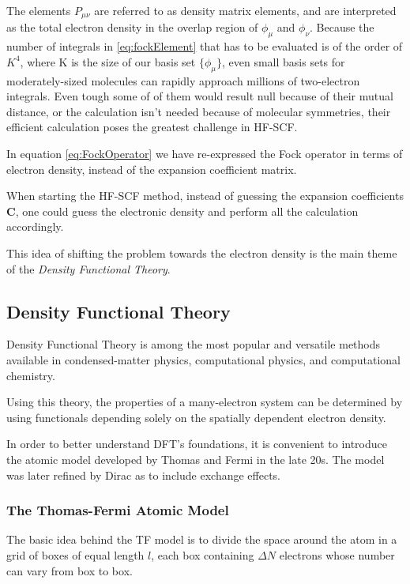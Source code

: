 \documentclass[a4paper,12pt]{article}
\begin{document}
The elements $P_{\mu \nu}$ are referred to as density matrix elements, and are interpreted as the total electron density in the overlap region of $\phi_{\mu}$ and $\phi_{\nu}$.
Because the number of integrals in \eqref{eq:fockElement} that has to be evaluated is of the order of $K^4$, where K is the size of our basis set $\{\phi_{\mu}\}$, even small basis sets for moderately-sized molecules can rapidly approach millions of two-electron integrals. 
Even tough some of of them would result null because of their mutual distance, or the calculation isn't needed because of molecular symmetries, their efficient calculation poses the greatest challenge in HF-SCF.


In equation \eqref{eq:FockOperator} we have re-expressed the Fock operator in terms of electron density, instead of the expansion coefficient matrix. 

When starting the HF-SCF method, instead of guessing the expansion coefficients $\mathbf{C}$, one could guess the electronic density and perform all the calculation accordingly.


This idea of shifting the problem towards the electron density is the main theme of the \textit{Density Functional Theory}.







\clearpage
\subsection{Density Functional Theory}

Density Functional Theory is among the most popular and versatile methods available in condensed-matter physics, computational physics, and computational chemistry.

Using this theory, the properties of a many-electron system can be determined by using functionals depending solely on the spatially dependent electron density.

In order to better understand DFT's foundations, it is convenient to introduce the atomic model developed by Thomas\cite{Thomas27} and Fermi\cite{Fermi27} in the late 20s. The model was later refined by Dirac as to include exchange effects.

\subsubsection{The Thomas-Fermi Atomic Model}

The basic idea behind the TF model is to divide the space around the atom in a grid of boxes of equal length $l$, each box containing $\Delta N$ electrons whose number can vary from box to box. 
\end{document}
